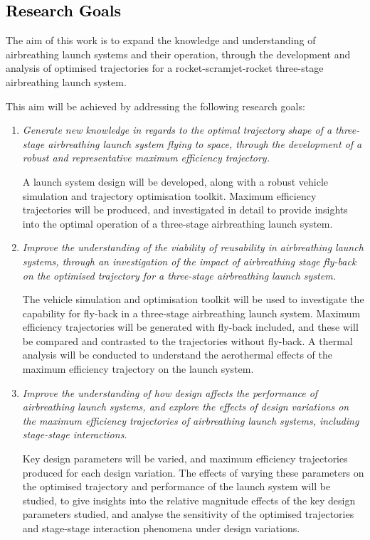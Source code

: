   	   

  	  	
  	  	\newpage
\textcolor{black}{
  \section{Research Goals}
}
\noindent
    The aim of this work is to expand the knowledge and understanding of airbreathing launch systems and their operation, through the development and analysis of optimised trajectories for a rocket-scramjet-rocket three-stage airbreathing launch system. 
    
\vspace*{10pt}
    \noindent This aim will be achieved by addressing the following research goals:
    \begin{enumerate}
    	 \item \emph{Generate new knowledge in regards to the optimal trajectory shape of a three-stage airbreathing launch system flying to space, through the development of a robust and representative maximum efficiency trajectory.}
    	 
    	 A launch system design will be developed, along with a robust vehicle simulation and trajectory optimisation toolkit. Maximum efficiency trajectories will be produced, and investigated in detail to provide insights into the optimal operation of a three-stage airbreathing launch system.  
    	    \\
\item \emph{Improve the understanding of the viability of reusability in airbreathing launch systems, through an investigation of the impact of airbreathing stage fly-back on the optimised trajectory for a three-stage airbreathing launch system. }

The vehicle simulation and optimisation toolkit will be used to investigate the capability for fly-back in a three-stage airbreathing launch system. Maximum efficiency trajectories will be generated with fly-back included, and these will be compared and contrasted to the trajectories without fly-back. A thermal analysis will be conducted to understand the aerothermal effects of the maximum efficiency trajectory on the launch system. 
 \\
      \item \emph{Improve the understanding of how design affects the performance of airbreathing launch systems, and explore the effects of design variations on the maximum efficiency trajectories of airbreathing launch systems, including stage-stage interactions.}
      
      Key design parameters will be varied, and maximum efficiency trajectories produced for each design variation. The effects of varying these parameters on the optimised trajectory and performance of the launch system will be studied, to give insights into the relative magnitude effects of the key design parameters studied, and analyse the sensitivity of the optimised trajectories and stage-stage interaction phenomena under design variations. 
\\
    \end{enumerate}

